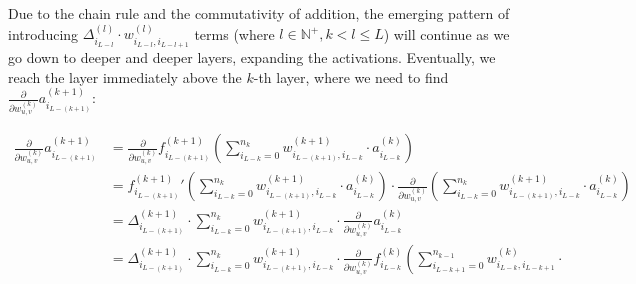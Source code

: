 \documentclass{article}
\begin{document}
          Due to the chain rule and the commutativity of addition, the emerging
          pattern of introducing
          $\Delta_{i_{L-l}}^{(l)} \cdot w_{i_{L-l},i_{L-l+1}}^{(l)}$ terms
          (where $l \in \mathbb{N}^+, k < l \leq L$)
          will continue as we go down to deeper and deeper layers, expanding the
          activations. Eventually, we reach the layer immediately above the
          $k$-th layer, where we need to find
          $\frac{\partial}{\partial w_{u,v}^{(k)}} a_{i_{L-(k+1)}}^{(k+1)}$:

          \begin{equation}
            \begin{split}
              \frac{\partial}{\partial w_{u,v}^{(k)}}
                a_{i_{L-(k+1)}}^{(k+1)}
                  & = \frac{\partial}{\partial w_{u,v}^{(k)}}
                        f_{i_{L-(k+1)}}^{(k+1)} \left(
                          \sum_{i_{L-k}=0}^{n_k}
                            w_{i_{L-(k+1)},i_{L-k}}^{(k+1)}
                            \cdot
                            a_{i_{L-k}}^{(k)}
                        \right) \\
                  & = {f_{i_{L-(k+1)}}^{(k+1)}}' \left(
                        \sum_{i_{L-k}=0}^{n_k}
                          w_{i_{L-(k+1)},i_{L-k}}^{(k+1)}
                          \cdot
                          a_{i_{L-k}}^{(k)}
                      \right)
                      \cdot
                      \frac{\partial}{\partial w_{u,v}^{(k)}}
                        \left(
                          \sum_{i_{L-k}=0}^{n_k}
                            w_{i_{L-(k+1)},i_{L-k}}^{(k+1)}
                            \cdot
                            a_{i_{L-k}}^{(k)}
                        \right) \\
                & = \Delta_{i_{L-(k+1)}}^{(k+1)}
                    \cdot
                    \sum_{i_{L-k}=0}^{n_k}
                      w_{i_{L-(k+1)},i_{L-k}}^{(k+1)}
                      \cdot
                      \frac{\partial}{\partial w_{u,v}^{(k)}}
                        a_{i_{L-k}}^{(k)} \\
                & = \Delta_{i_{L-(k+1)}}^{(k+1)}
                    \cdot
                    \sum_{i_{L-k}=0}^{n_k}
                      w_{i_{L-(k+1)},i_{L-k}}^{(k+1)}
                      \cdot
                      \frac{\partial}{\partial w_{u,v}^{(k)}}
                        f_{i_{L-k}}^{(k)} \left(
                          \sum_{i_{L-k+1}=0}^{n_{k-1}}
                            w_{i_{L-k},i_{L-k+1}}^{(k)}
                            \cdot

\end{split}
\end{equation}
\end{document}
